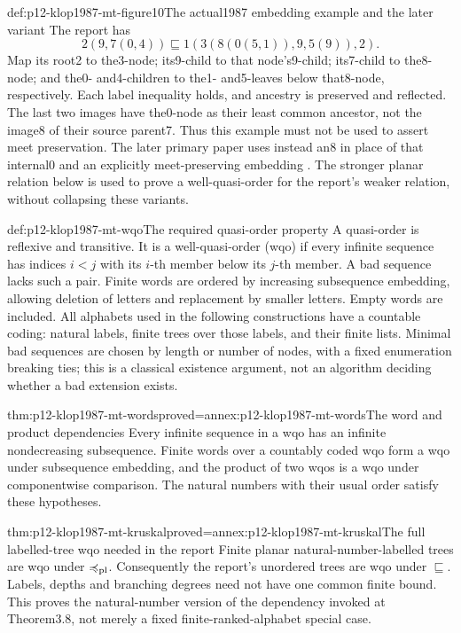 \begin{hbexample}{def:p12-klop1987-mt-figure10}{The actual1987 embedding example and the later variant}
The report has
\[
 2(9,7(0,4))\sqsubseteq1(3(8(0(5,1)),9,5(9)),2).
\]
Map its root2 to the3-node; its9-child to that node's9-child;
its7-child to the8-node; and the0- and4-children to the1- and5-leaves
below that8-node, respectively. Each label inequality holds, and
ancestry is preserved and reflected. The last two images have the0-node
as their least common ancestor, not the image8 of their source parent7.
Thus this example must not be used to assert meet preservation.
The later primary paper uses instead an8 in place of that internal0
and an explicitly meet-preserving embedding
\parencite[Example4.3]{EndrullisKlopOverbeek2021MarkedTrees}.
The stronger planar relation below is used to prove a well-quasi-order
for the report's weaker relation, without collapsing these variants.
\end{hbexample}

\begin{hbdefinition}{def:p12-klop1987-mt-wqo}{The required quasi-order property}
A quasi-order is reflexive and transitive. It is a well-quasi-order
(wqo) if every infinite sequence has indices \(i<j\) with its
\(i\)-th member below its \(j\)-th member. A bad sequence lacks
such a pair. Finite words are ordered by increasing subsequence
embedding, allowing deletion of letters and replacement by smaller
letters. Empty words are included.
All alphabets used in the following constructions have a countable
coding: natural labels, finite trees over those labels, and their
finite lists. Minimal bad sequences are chosen by length or number
of nodes, with a fixed enumeration breaking ties; this is a classical
existence argument, not an algorithm deciding whether a bad extension
exists.
\end{hbdefinition}

\begin{hblemma}{thm:p12-klop1987-mt-words}{proved=annex:p12-klop1987-mt-words}{The word and product dependencies}
Every infinite sequence in a wqo has an infinite nondecreasing
subsequence. Finite words over a countably coded wqo form a wqo under
subsequence embedding, and the product of two wqos is a wqo under
componentwise comparison. The natural numbers with their usual order
satisfy these hypotheses.
\end{hblemma}

\begin{hbtheorem}{thm:p12-klop1987-mt-kruskal}{proved=annex:p12-klop1987-mt-kruskal}{The full labelled-tree wqo needed in the report}
Finite planar natural-number-labelled trees are wqo under
\(\preccurlyeq_{\rm pl}\). Consequently the report's unordered
trees are wqo under \(\sqsubseteq\). Labels, depths and branching
degrees need not have one common finite bound. This proves the
natural-number version of the dependency invoked at Theorem3.8,
not merely a fixed finite-ranked-alphabet special case.
\end{hbtheorem}

